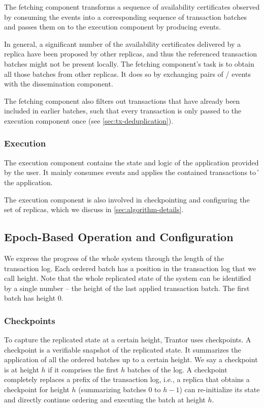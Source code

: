 \documentclass{article}
\begin{document}
The fetching component transforms a sequence of availability certificates observed by consuming the  events
into a corresponding sequence of transaction batches and passes them on to the execution component by producing  events.

In general, a significant number of the availability certificates delivered by a replica have been proposed by other replicas,
and thus the referenced transaction batches might not be present locally.
The fetching component’s task is to obtain all those batches from other replicas.
It does so by exchanging pairs of  /  events with the dissemination component.

The fetching component also filters out transactions that have already been included in earlier batches,
such that every transaction is only passed to the execution component once (see \cref{sec:tx-deduplication}).

\subsubsection{Execution}

The execution component contains the state and logic of the application provided by the user.
It mainly consumes  events and applies the contained transactions to´ the application.

The execution component is also involved in checkpointing and configuring the set of replicas, which we discuss in \cref{sec:algorithm-details}.

\subsection{Epoch-Based Operation and Configuration}
\label{sec:epochs-and-configuration}

We express the progress of the whole system through the length of the transaction log.
Each ordered batch has a position in the transaction log that we call height.
Note that the whole replicated state of the system can be identified by a single number
– the height of the last applied transaction batch.
The first batch has height 0.

\subsubsection{Checkpoints}

To capture the replicated state at a certain height, Trantor uses checkpoints.
A checkpoint is a verifiable snapshot of the replicated state.
It summarizes the application of all the ordered batches up to a certain height.
We say a checkpoint is at height $h$ if it comprises the first $h$ batches of the log.
A checkpoint completely replaces a prefix of the transaction log,
i.e., a replica that obtains a checkpoint for height $h$ (summarizing batches $0$ to $h-1$)
can re-initialize its state and directly continue ordering and executing the batch at height $h$.
\end{document}
